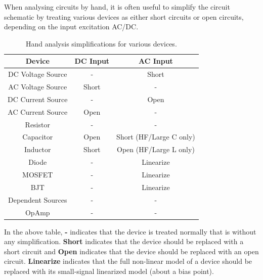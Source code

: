 When analysing circuits by hand, it is often useful to simplify the
circuit schematic by treating various devices as either short circuits
or open circuits, depending on the input excitation AC/DC.
\begin{table}[H]
    \centering
    \begin{tabular}{|c|c|c|}\hline
      \textbf{Device}   & \textbf{DC Input} & \textbf{AC Input} \\ \hline
      DC Voltage Source & -                 & Short \\ \hline
      AC Voltage Source & Short             & -     \\ \hline
      DC Current Source & -                 & Open  \\ \hline
      AC Current Source & Open              & -     \\ \hline
      Resistor          & -                 & -     \\ \hline
      Capacitor         & Open              & Short (HF/Large C only) \\ \hline
      Inductor          & Short             & Open (HF/Large L only) \\ \hline
      Diode             & -                 & Linearize \\ \hline
      MOSFET            & -                 & Linearize \\ \hline
      BJT               & -                 & Linearize \\ \hline
      Dependent Sources & -                 & -     \\ \hline
      OpAmp             & -                 & -     \\ \hline
    \end{tabular}
    \caption{Hand analysis simplifications for various devices.}\label{tab:hand-analysis-simplifications}
\end{table}

In the above table, \textbf{-} indicates that the device is treated normally
that is without any simplification. \textbf{Short} indicates that the device
should be replaced with a short circuit and \textbf{Open} indicates that the
device should be replaced with an open circuit. \textbf{Linearize} indicates
that the full non-linear model of a device should be replaced with its
small-signal linearized model (about a bias point).

